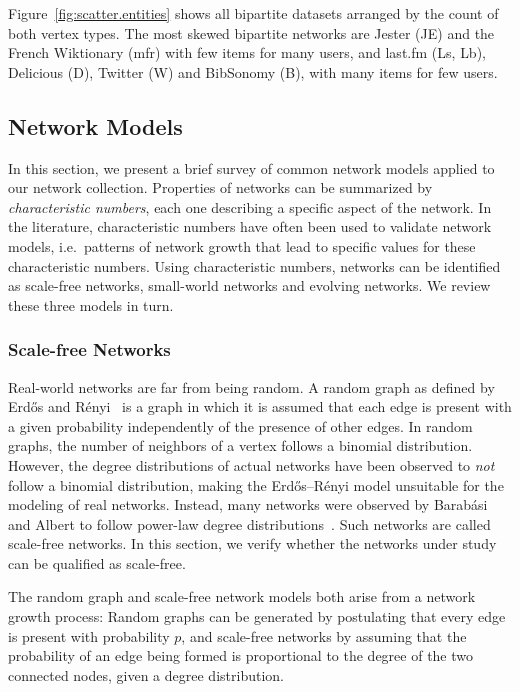 \documentclass[11pt,a4paper]{book}
\begin{document}
Figure~\ref{fig:scatter.entities} shows all bipartite
datasets arranged by the count of both vertex types.  The most skewed
bipartite networks are Jester (\textsf{JE}) and the French Wiktionary
(\textsf{mfr}) with few items for many 
users, and last.fm (\textsf{Ls}, \textsf{Lb}), Delicious (\textsf{D}),
Twitter (\textsf{W})
and BibSonomy (\textsf{B}), with 
many items for few users.

\subsection{Network Models}
\label{sec:network-models}
In this section, we present a brief survey of common network models
applied to our network collection. 
Properties of networks can be summarized by \emph{characteristic
  numbers}, each one describing a specific aspect of the network.  In the
literature, characteristic numbers have often been used to validate
network models, i.e.\ patterns of network growth that lead to specific
values for these characteristic numbers. 
Using characteristic numbers, networks can be identified as scale-free
networks, small-world networks and evolving networks.  We review these
three models in turn. 

\subsubsection{Scale-free Networks}
\label{sec:scale-free}
Real-world networks are far from being random.  A random graph as
defined by Erdős and Rényi~\cite{b569} is a graph in which it is assumed
that each edge is present with a given probability independently of the
presence of other edges.  In random graphs, the number of neighbors of a
vertex follows a binomial distribution.  However, the degree
distributions of actual networks have been observed to \emph{not} follow
a binomial distribution, making the Erdős--Rényi model unsuitable for
the modeling of real networks.  Instead, many networks were observed by
Barabási and Albert to
follow power-law degree distributions~\cite{b439}.  Such networks are
called scale-free networks.  In this section, we verify whether the
networks under study can be qualified as scale-free.

The random graph and scale-free network models both arise from a network
growth process:  Random graphs can be generated by postulating that every
edge is present with 
probability $p$, and scale-free networks by assuming that the
probability of an edge being formed is proportional to the degree of
the two connected nodes, given a degree distribution. 
\end{document}
